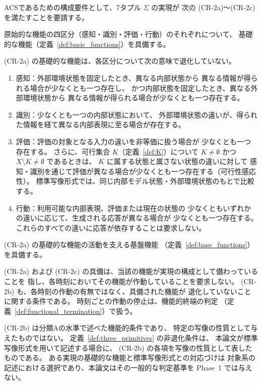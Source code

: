 ACSであるための構成要件として、7タプル $\Sigma$ の実現が
次の (CR-2a)〜(CR-2c) を満たすことを要請する。
\begin{description}[style=nextline]
  \item[(CR-2a) 基礎的な機能の具備]
  原始的な機能の四区分（感知・識別・評価・行動）のそれぞれについて、
  基礎的な機能（定義~\ref{def:basic_functions}）を具備する。
  \item[(CR-2b) 機能的非退化性]
  (CR-2a) の基礎的な機能は、各区分について次の意味で退化していない。
  \begin{enumerate}[label=(\roman*)]
    \item 感知：外部環境状態を固定したとき、異なる内部状態から
    異なる情報が得られる場合が少なくとも一つ存在し、
    かつ内部状態を固定したとき、異なる外部環境状態から
    異なる情報が得られる場合が少なくとも一つ存在する。
    \item 識別：少なくとも一つの内部状態において、
    外部環境状態の違いが、得られた情報を経て異なる内部表現に至る場合が存在する。
    \item 評価：評価の対象となる入力の違いを非等価に扱う場合が
    少なくとも一つ存在する。
    さらに、可行集合 $K$（定義~\ref{def:K}）について
    $K\neq\emptyset$ かつ $X\setminus K\neq\emptyset$ であるときは、
    $K$ に属する状態と属さない状態の違いに対して
    感知・識別を通じて評価が異なる場合が少なくとも一つ存在する（可行性感応性）。
    標準写像形式では、同じ内部モデル状態・外部環境状態のもとで比較する。
    \item 行動：利用可能な内部表現、評価または現在の状態の
    少なくともいずれかの違いに応じて、生成される応答が異なる場合が
    少なくとも一つ存在する。
    これらのすべての違いに応答が依存することは要求しない。
  \end{enumerate}
  \item[(CR-2c) 基盤機能の具備]
  (CR-2a) の基礎的な機能の活動を支える基盤機能
  （定義~\ref{def:base_functions}）を具備する。
\end{description}

(CR-2a) および (CR-2c) の具備は、当該の機能が実現の構成として備わっていることを
指し、各時刻においてその機能が作動していることを要求しない。
(CR-2b) も、各時刻の作動の有無ではなく、具備された機能が
退化していないことに関する条件である。
時刻ごとの作動の停止は、機能的終端の判定
（定義~\ref{def:functional_termination}）で扱う。

(CR-2b) は分類Aの水準で述べた機能的条件であり、
特定の写像の性質として与えたものではない。
定義~\ref{def:three_primitives} の非退化条件は、
本論文が標準写像形式を用いて記述する場合に、
(CR-2b) の各項を写像の性質として表したものである。
ある実現の基礎的な機能と標準写像形式との対応づけは
対象系の記述における選択であり、本論文はその一般的な判定基準を
Phase~1 では与えない。

